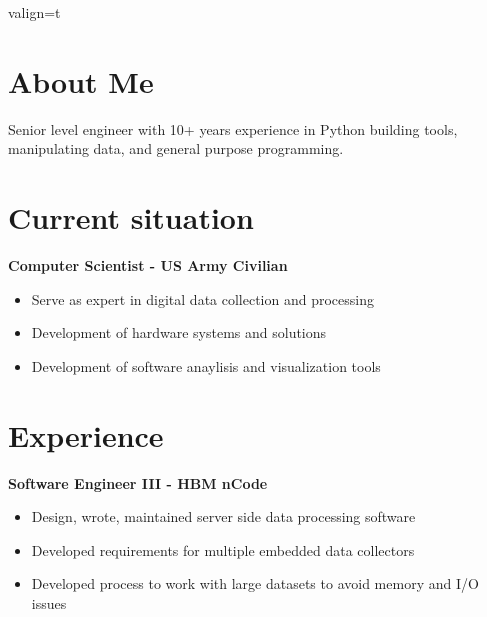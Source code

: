\documentclass[a4paper,10pt]{article}
\begin{document}
\begin{adjustbox}{valign=t}
\begin{minipage}{0.6\textwidth} %

\section*{About Me}

	\raggedright
	Senior level engineer with 10+ years experience in Python building tools, manipulating data, and general purpose programming.
\section*{Current situation}
\begin{description}
\raggedright
\item[\normalfont \textcolor{ColorOne}{Sep. 2016 - Present}] \textbf{Computer Scientist - US Army Civilian}\\ \medskip
\begin{itemize}
	\item Serve as  expert in digital data collection and processing
	\item Development of hardware systems and solutions
	\item Development of software anaylisis and visualization tools
\end{itemize}
\end{description}

\section*{Experience}
\begin{description}
\raggedright
\item[\normalfont \textcolor{ColorOne}{Feb. 2014 - Sep. 2016}] \textbf{Software Engineer III - HBM nCode} \\ \medskip

\begin{itemize}
	\item Design, wrote, maintained server side data processing software
	\item Developed requirements for multiple embedded data collectors
	\item Developed process to work with large datasets to avoid memory and I/O issues
\end{itemize}



\end{description}
\end{minipage}
\end{adjustbox}
\end{document}
